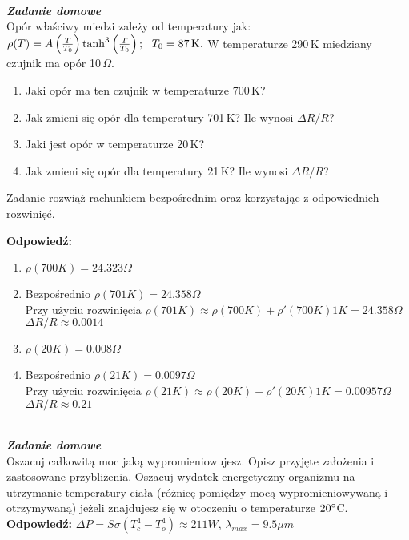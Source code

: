 \documentclass[11pt,a4paper]{article}
\newcounter{zaddom}\newcommand{\zaddom}[1][]{\addtocounter{zaddom}{1} ~\\  {\bf \emph{Zadanie domowe \arabic{zaddom} #1 }} \\}
\begin{document}
\zaddom
Opór właściwy miedzi zależy od temperatury jak:
$ \rho(T) = 
  A \left(\frac{T}{T_0}\right) \tanh^3 \left(\frac{T}{T_0}\right);
  ~~ T_0 = 87\,\rm{K}. 
$
W temperaturze 290\,K miedziany czujnik ma opór 10\,$\Omega$. 
\begin{enumerate}
\item Jaki opór ma ten czujnik w temperaturze 700\,K? 
\item Jak zmieni się opór dla temperatury 701\,K? Ile wynosi $\Delta R/R$? 
\item Jaki jest opór w temperaturze 20\,K?
\item Jak zmieni się opór dla temperatury 21\,K? Ile wynosi  $\Delta R/R$?
\end{enumerate}
Zadanie rozwiąż rachunkiem bezpośrednim oraz korzystając z odpowiednich rozwinięć.

\vskip 10pt
\textbf{Odpowiedź:}
\begin{enumerate}
\item $\rho(700 K) = 24.323 \Omega$
\item Bezpośrednio $\rho(701 K) = 24.358 \Omega$\\
 Przy użyciu rozwinięcia $\rho(701 K) \approx \rho(700 K) + \rho'(700 K) 1 K = 24.358 \Omega$\\
 $\Delta R/R \approx 0.0014$
\item $\rho(20 K) = 0.008 \Omega$
\item Bezpośrednio $\rho(21 K) = 0.0097 \Omega$\\
 Przy użyciu rozwinięcia $\rho(21 K) \approx \rho(20 K) + \rho'(20 K) 1 K = 0.00957 \Omega$\\
 $\Delta R/R \approx 0.21$
\end{enumerate}

\newpage

\zaddom
Oszacuj całkowitą moc jaką wypromieniowujesz. Opisz przyjęte założenia i zastosowane przybliżenia. Oszacuj
wydatek energetyczny organizmu na utrzymanie temperatury ciała (różnicę pomiędzy mocą wypromieniowywaną
i otrzymywaną) jeżeli znajdujesz się w otoczeniu o temperaturze $20\degree$C.
\vskip 10pt
\textbf{Odpowiedź:}
$\Delta P = S \sigma (T_c^4-T_o^4) \approx 211 W$, $\lambda_{max} = 9.5 \mu m$
\end{document}
